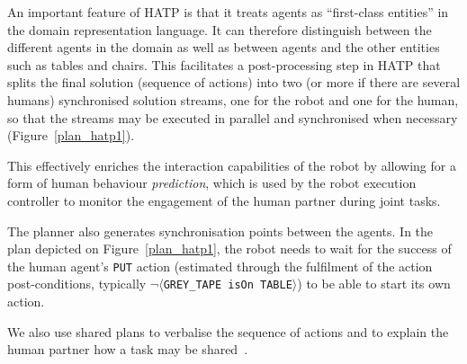 \documentclass[preprint,3p,times]{elsarticle}
\newcommand{\stmt}[1]{{\footnotesize\tt$\langle$#1\relax$\rangle$}}
\begin{document}
An important feature of HATP is that it treats agents as ``first-class
entities'' in the domain representation language. It can therefore
distinguish between the different agents in the domain as well as
between agents and the other entities such as tables and chairs. This
facilitates a post-processing step in HATP that splits the final
solution (sequence of actions) into two (or more if there are several
humans) synchronised solution
streams, one for the robot and one for the human, so that the streams may be executed in
parallel and synchronised when necessary (Figure~\ref{plan_hatp1}).

This effectively enriches the interaction capabilities
of the robot by allowing for a form of human behaviour \emph{prediction}, which
is used by the robot execution controller to monitor the engagement of the human
partner during joint tasks.

The planner also generates synchronisation points between the agents.  In the
plan depicted on Figure~\ref{plan_hatp1}, the robot needs to wait for the
success of the human agent's {\tt PUT} action (estimated through the fulfilment
of the action post-conditions, typically $\neg$\stmt{GREY\_TAPE isOn TABLE}) to
be able to start its own action.

We also use shared plans to verbalise the sequence of actions and to explain
the human partner how a task may be shared~\cite{warnier2012when}.
\end{document}
